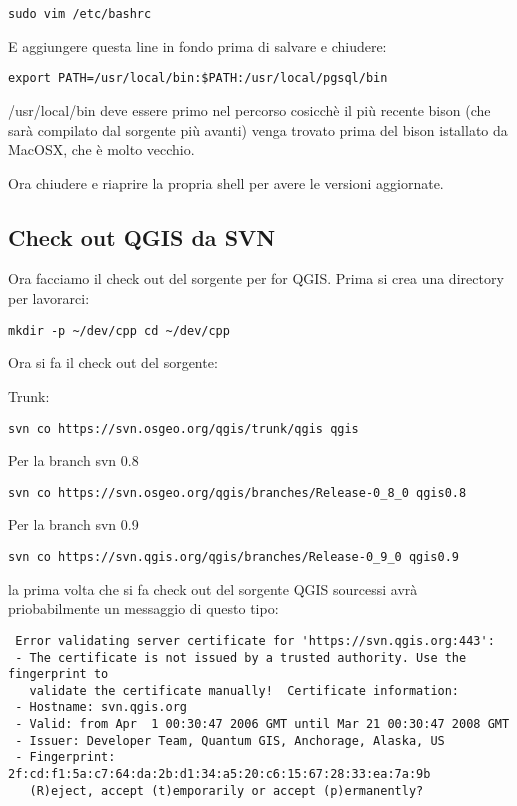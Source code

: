 \begin{verbatim}
sudo vim /etc/bashrc 
\end{verbatim}

E aggiungere questa line in fondo prima di salvare e chiudere:

\begin{verbatim}
export PATH=/usr/local/bin:$PATH:/usr/local/pgsql/bin 
\end{verbatim}

/usr/local/bin deve essere primo nel percorso cosicchè il più recente bison (che sarà compilato dal sorgente più avanti) venga trovato prima del bison istallato da MacOSX, che è molto vecchio.

Ora chiudere e riaprire la propria shell per avere le versioni aggiornate.

\subsection{Check out QGIS da SVN}
Ora facciamo il check out del sorgente per for QGIS. Prima si crea una directory per lavorarci:

\begin{verbatim}
mkdir -p ~/dev/cpp cd ~/dev/cpp 
\end{verbatim}

Ora si fa il check out del sorgente:

Trunk:

\begin{verbatim}
svn co https://svn.osgeo.org/qgis/trunk/qgis qgis 
\end{verbatim}

Per la branch svn 0.8 

\begin{verbatim}
svn co https://svn.osgeo.org/qgis/branches/Release-0_8_0 qgis0.8
\end{verbatim}

Per la branch svn 0.9 

\begin{verbatim}
svn co https://svn.qgis.org/qgis/branches/Release-0_9_0 qgis0.9
\end{verbatim}

la prima volta che si fa check out del sorgente QGIS sourcessi avrà priobabilmente un messaggio di questo tipo:

\begin{verbatim}
 Error validating server certificate for 'https://svn.qgis.org:443':
 - The certificate is not issued by a trusted authority. Use the fingerprint to
   validate the certificate manually!  Certificate information:
 - Hostname: svn.qgis.org
 - Valid: from Apr  1 00:30:47 2006 GMT until Mar 21 00:30:47 2008 GMT
 - Issuer: Developer Team, Quantum GIS, Anchorage, Alaska, US
 - Fingerprint: 2f:cd:f1:5a:c7:64:da:2b:d1:34:a5:20:c6:15:67:28:33:ea:7a:9b
   (R)eject, accept (t)emporarily or accept (p)ermanently?  
\end{verbatim}

